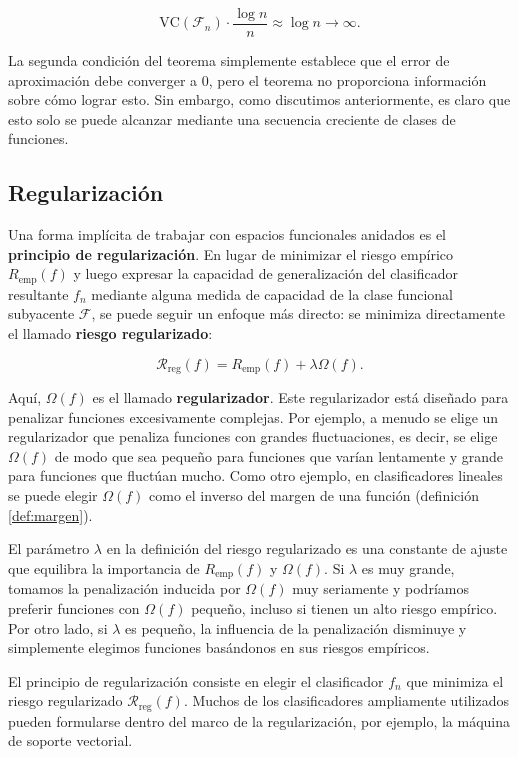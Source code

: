 \documentclass{report}
\begin{document}
\[
\text{VC}(\mathcal{F}_n) \cdot \frac{\log n}{n} \approx \log n \to \infty.
\]

La segunda condición del teorema simplemente establece que el error de aproximación debe converger a \(0\), pero
el teorema no proporciona información sobre cómo lograr esto. Sin embargo, como discutimos anteriormente, es claro
que esto solo se puede alcanzar mediante una secuencia creciente de clases de funciones.

\subsection{Regularización}

Una forma implícita de trabajar con espacios funcionales anidados es el \textbf{principio de regularización}.
En lugar de minimizar el riesgo empírico \(R_{\text{emp}}(f)\) y luego expresar la capacidad de generalización
del clasificador resultante \(f_n\) mediante alguna medida de capacidad de la clase funcional subyacente
\(\mathcal{F}\), se puede seguir un enfoque más directo: se minimiza directamente el llamado \textbf{riesgo
regularizado}:

\[
\mathcal{R}_{\text{reg}}(f) = R_{\text{emp}}(f) + \lambda \Omega(f).
\]

Aquí, \(\Omega(f)\) es el llamado \textbf{regularizador}. Este regularizador está diseñado para penalizar
funciones excesivamente complejas. Por ejemplo, a menudo se elige un regularizador que penaliza funciones con
grandes fluctuaciones, es decir, se elige \(\Omega(f)\) de modo que sea pequeño para funciones que varían
lentamente y grande para funciones que fluctúan mucho. Como otro ejemplo, en clasificadores lineales se puede
elegir \(\Omega(f)\) como el inverso del margen de una función (definición \ref{def:margen}).

El parámetro \(\lambda\) en la definición del riesgo regularizado es una constante de ajuste que equilibra la
importancia de \(R_{\text{emp}}(f)\) y \(\Omega(f)\). Si \(\lambda\) es muy grande, tomamos la penalización
inducida por \(\Omega(f)\) muy seriamente y podríamos preferir funciones con \(\Omega(f)\) pequeño, incluso si
tienen un alto riesgo empírico. Por otro lado, si \(\lambda\) es pequeño, la influencia de la penalización
disminuye y simplemente elegimos funciones basándonos en sus riesgos empíricos.

El principio de regularización consiste en elegir el clasificador \(f_n\) que minimiza el riesgo regularizado
\(\mathcal{R}_{\text{reg}}(f)\). Muchos de los clasificadores ampliamente utilizados pueden formularse dentro
del marco de la regularización, por ejemplo, la máquina de soporte vectorial.
\end{document}
